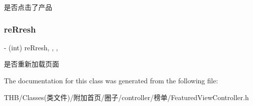 是否点击了产品 \mbox{\label{interface_featured_view_controller_a492cb2bf9a5415557923b51ba187f783}} 
\subsubsection{\texorpdfstring{re\+Rresh}{reRresh}}
{\footnotesize\ttfamily -\/ (int) re\+Rresh\hspace{0.3cm}{\ttfamily [read]}, {\ttfamily [write]}, {\ttfamily [nonatomic]}, {\ttfamily [assign]}}

是否重新加载页面 

The documentation for this class was generated from the following file\+:\begin{DoxyCompactItemize}
\item 
T\+H\+B/\+Classes(类文件)/附加首页/圈子/controller/榜单/Featured\+View\+Controller.\+h\end{DoxyCompactItemize}
